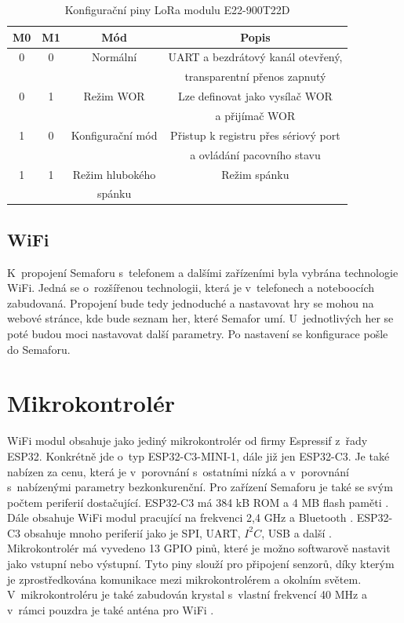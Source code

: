 \begin{table}[!h]
  \caption[Konfigurační piny LoRa modulu E22-900T22D]{Konfigurační piny LoRa modulu E22-900T22D \cite{LoRa_ebyte}}
  \begin{center}
  	\small
	  \begin{tabular}{|c|c|c|c|}
	    \hline
	    \textbf{M0}	& \textbf{M1}	& \textbf{Mód} & \textbf{Popis} \\
	    \hline
	    0	& 0 & Normální & UART a bezdrátový kanál otevřený, \\ 
      & & &transparentní přenos zapnutý \\ 
	    \hline
	    0	& 1 & Režim WOR & Lze definovat jako vysílač WOR \\
      & & & a přijímač WOR \\ 
	    \hline
	    1 & 0 & Konfigurační mód & Přistup k registru přes sériový port \\
      & & & a ovládání pacovního stavu \\
	    \hline
      1 & 1 & Režim hlubokého & Režim spánku \\
      & & spánku & \\
	    \hline
	  \end{tabular}
  \end{center}
\end{table}


\subsection{WiFi}
K~propojení Semaforu s~telefonem a dalšími zařízeními byla vybrána technologie WiFi. Jedná se o~rozšířenou technologii, která je v~telefonech a noteboocích zabudovaná. 
Propojení bude tedy jednoduché a nastavovat hry se mohou na webové stránce, kde bude seznam her, které Semafor umí. U~jednotlivých her se poté budou moci nastavovat 
další parametry. Po nastavení se konfigurace pošle do Semaforu. 


\section{Mikrokontrolér}
WiFi modul obsahuje jako jediný mikrokontrolér od firmy Espressif z~řady ESP32. Konkrétně jde o~typ ESP32-C3-MINI-1, dále již jen ESP32-C3. Je také nabízen za cenu, která 
je v~porovnání s~ostatními nízká a v~porovnání s~nabízenými parametry bezkonkurenční. Pro zařízení Semaforu je také se svým počtem periferií dostačující. ESP32-C3 má 
384 kB ROM a 4 MB flash paměti \cite{ESP_C3_dtsh}. Dále obsahuje WiFi modul pracující na frekvenci 2,4 GHz a Bluetooth \cite{ESP_C3_dtsh}. ESP32-C3 obsahuje mnoho periferií
jako je SPI, UART, $I^2C$, USB a další \cite{ESP_C3_dtsh}. Mikrokontrolér má vyvedeno 13 GPIO pinů, které je možno softwarově nastavit jako vstupní nebo výstupní. Tyto piny
slouží pro připojení senzorů, díky kterým je zprostředkována komunikace mezi mikrokontrolérem a okolním světem. V~mikrokontroléru je také zabudován krystal s~vlastní frekvencí 
40 MHz a v~rámci pouzdra je také anténa pro WiFi \cite{ESP_C3_dtsh}.


